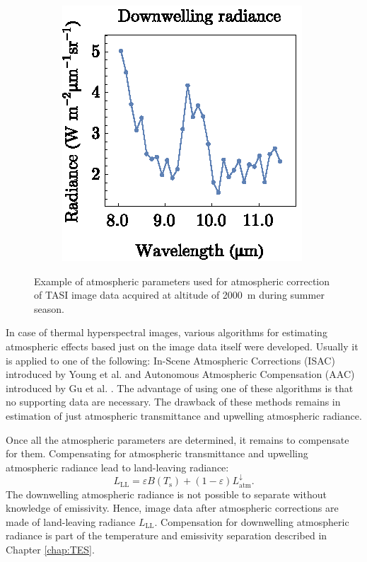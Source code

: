 \begin{figure}[htb]
	\hspace{1em}
	\begin{subfigure}[t]{.3\linewidth}
		\centering
		\includegraphics[scale=1]{pics/Chapter_02/Downwelling.eps}
		\vspace{-0.4cm}
		\caption{}
	\end{subfigure}
	\vspace{1.5 em}
	\caption{Example of atmospheric parameters used for atmospheric correction of TASI image data acquired at altitude of \SI{2000}{\meter} during summer season.}
	\label{fig:AtmParams}
\end{figure}

In case of thermal hyperspectral images, various algorithms for estimating atmospheric effects based just on the image data itself were developed. Usually it is applied to one of the following: In-Scene Atmospheric Corrections (ISAC) introduced by Young et al. \cite{Y02} and Autonomous Atmospheric Compensation (AAC) introduced by Gu et al. \cite{GG00}. The advantage of using one of these algorithms is that no supporting data are necessary. The drawback of these methods remains in estimation of just atmospheric transmittance and upwelling atmospheric radiance.

Once all the atmospheric parameters are determined, it remains to compensate for them. Compensating for atmospheric transmittance and upwelling atmospheric radiance lead to land-leaving radiance:
\begin{equation}
\label{eq:landleavingRadiance}
L_\mathrm{LL} = \varepsilon B(T_\mathrm{s}) + (1 - \varepsilon) L^\downarrow_\mathrm{atm}.
\end{equation}
The downwelling atmospheric radiance is not possible to separate without knowledge of emissivity. Hence, image data after atmospheric corrections are made of land-leaving radiance $L_\mathrm{LL}$. Compensation for downwelling atmospheric radiance is part of the temperature and emissivity separation described in Chapter \ref{chap:TES}.

